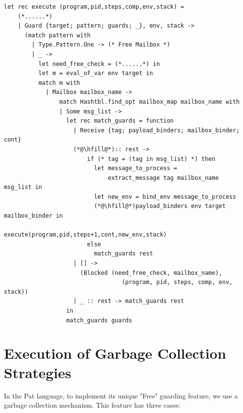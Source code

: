 \documentclass{l4proj}
\begin{document}
\noindent\begin{minipage}{\linewidth}
\lstset{style=Ocamlstyle,}
\begin{lstlisting}[caption={Message reception and guard evaluation in Pat}, label={lst:Guard}]
let rec execute (program,pid,steps,comp,env,stack) =
    (*......*)
    | Guard {target; pattern; guards; _}, env, stack ->
      (match pattern with  
        | Type.Pattern.One -> (* Free Mailbox *)
        | _ ->
          let need_free_check = (*......*) in
          let m = eval_of_var env target in
          match m with
            | Mailbox mailbox_name ->
                match Hashtbl.find_opt mailbox_map mailbox_name with
                | Some msg_list -> 
                  let rec match_guards = function
                    | Receive {tag; payload_binders; mailbox_binder; cont} 
                    (*@\hfill@*):: rest ->
                        if (* tag = (tag in msg_list) *) then
                          let message_to_process = 
                              extract_message tag mailbox_name msg_list in
                          let new_env = bind_env message_to_process 
                          (*@\hfill@*)payload_binders env target mailbox_binder in
                          execute(program,pid,steps+1,cont,new_env,stack)
                        else
                          match_guards rest
                    | [] -> 
                      (Blocked (need_free_check, mailbox_name), 
                                  (program, pid, steps, comp, env, stack))
                    | _ :: rest -> match_guards rest 
                  in
                  match_guards guards
\end{lstlisting}
\end{minipage}

\section{Execution of Garbage Collection Strategies}

In the Pat language, to implement its unique "Free" guarding feature, we use a garbage collection mechanism. This feature has three cases:
\end{document}
